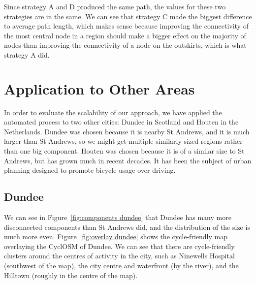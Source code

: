 \documentclass[12pt,a4paper]{report}
\begin{document}
Since strategy A and D produced the same path, the values for these two strategies are in the same. We can see that strategy C made the biggest difference to average path length, which makes sense because improving the connectivity of the most central node in a region should make a bigger effect on the majority of nodes than improving the connectivity of a node on the outskirts, which is what strategy A did.

\section{Application to Other Areas}
In order to evaluate the scalability of our approach, we have applied the automated process to two other cities: Dundee in Scotland and Houten in the Netherlands. Dundee was chosen because it is nearby St Andrews, and it is much larger than St Andrews, so we might get multiple similarly sized regions rather than one big component. Houten was chosen because it is of a similar size to St Andrews, but has grown much in recent decades. It has been the subject of urban planning designed to promote bicycle usage over driving.

\subsection{Dundee}
We can see in Figure~\ref{fig:components dundee} that Dundee has many more disconnected components than St Andrews did, and the distribution of the size is much more even. Figure~\ref{fig:overlay dundee} shows the cycle-friendly map overlaying the CyclOSM of Dundee. We can see that there are cycle-friendly clusters around the centres of activity in the city, such as Ninewells Hospital (southwest of the map), the city centre and waterfront (by the river), and the Hilltown (roughly in the centre of the map).
\end{document}
